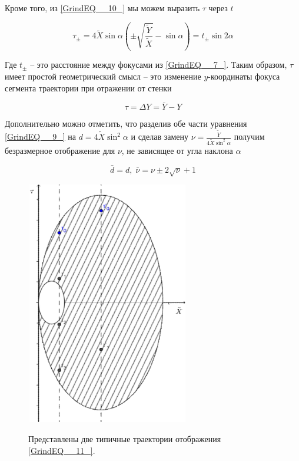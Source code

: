 \documentclass[a4paper]{article}
\begin{document}
Кроме того, из \eqref{GrindEQ__10_} мы можем выразить $\tau $ через $t$

\begin{equation} \label{GrindEQ__11_1_} \tau _{\pm } =4\tilde{X}\sin \alpha \left(\pm \sqrt{\frac{\tilde{Y}}{\tilde{X}} } -\sin \alpha \right)=t_{\pm } \sin 2\alpha  \end{equation}

Где $t_{\pm } $ -- это расстояние между фокусами из \eqref{GrindEQ__7_}. Таким образом, $\tau $ имеет простой геометрический смысл -- это изменение $y$-координаты фокуса сегмента траектории при отражении от стенки

\begin{equation} \label{GrindEQ__11_2_} \tau =\Delta Y=\bar{Y}-Y \end{equation}

Дополнительно можно  отметить, что разделив обе части уравнения \eqref{GrindEQ__9_} на $d=4\tilde{X}\sin ^{2} \alpha $ и сделав замену $\nu =\frac{\tilde{Y}}{4\tilde{X}\sin ^{2} \alpha } $ получим безразмерное отображение для $\nu $, не зависящее от угла наклона $\alpha $

\begin{equation} \label{GrindEQ__11_2_1_}\bar{d}=d,\; \bar{\nu }=\nu \pm 2\sqrt{\nu } +1 \end{equation}

\begin{figure}[ht]
  \centering
  \includegraphics[width=71.2mm, height=106.7mm, viewport=3mm 4mm 205mm 292mm]{image9.eps}\\
  \caption{Представлены две типичные траектории отображения \eqref{GrindEQ__11_}.}\label{image9}
\end{figure}
\end{document}
